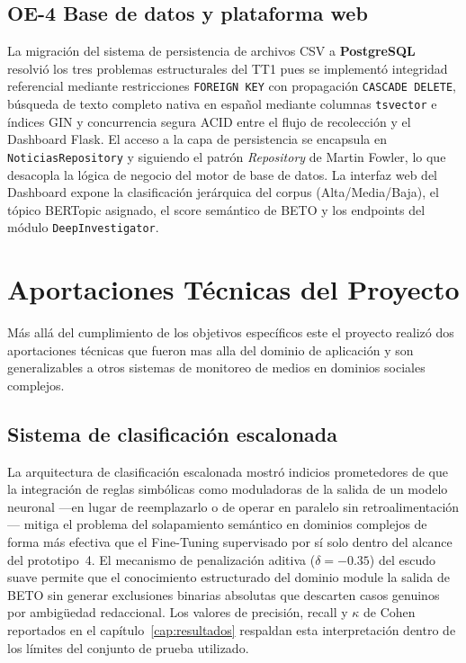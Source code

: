 \subsection*{OE-4 Base de datos y plataforma web}
\label{subsec:conc_oe4}

La migración del sistema de persistencia de archivos CSV a \textbf{PostgreSQL}
resolvió los tres problemas estructurales del TT1 pues se implementó integridad referencial
mediante restricciones \texttt{FOREIGN KEY} con propagación \texttt{CASCADE DELETE},
búsqueda de texto completo nativa en español mediante columnas \texttt{tsvector}
e índices GIN y concurrencia segura ACID entre el flujo de recolección y el Dashboard
Flask. El acceso a la capa de persistencia se encapsula en \texttt{NoticiasRepository}
y siguiendo el patrón \textit{Repository} de Martin Fowler, lo que desacopla la lógica
de negocio del motor de base de datos. La interfaz web del Dashboard expone la clasificación
jerárquica del corpus (Alta/Media/Baja), el tópico BERTopic asignado, el score
semántico de BETO y los endpoints del módulo \texttt{DeepInvestigator}.


\section*{Aportaciones Técnicas del Proyecto}
\label{sec:conc_aportaciones}

Más allá del cumplimiento de los objetivos específicos este el proyecto realizó dos
aportaciones técnicas que fueron mas alla del dominio de aplicación y son generalizables
a otros sistemas de monitoreo de medios en dominios sociales complejos.

\subsection*{Sistema de clasificación escalonada}
\label{subsec:conc_neurosimbolico}

La arquitectura de clasificación escalonada mostró indicios prometedores de que la
integración de reglas simbólicas como moduladoras de la salida de un
modelo neuronal —en lugar de reemplazarlo o de operar en paralelo sin retroalimentación—
mitiga el problema del solapamiento semántico en dominios complejos de forma
más efectiva que el Fine-Tuning supervisado por sí solo dentro del alcance
del prototipo~4. El mecanismo de penalización aditiva ($\delta = -0.35$) del escudo suave
permite que el conocimiento estructurado del dominio module la salida de BETO
sin generar exclusiones binarias absolutas que descarten casos genuinos por
ambigüedad redaccional. Los valores de precisión, recall y $\kappa$ de Cohen
reportados en el capítulo~\ref{cap:resultados} respaldan esta interpretación
dentro de los límites del conjunto de prueba utilizado.


